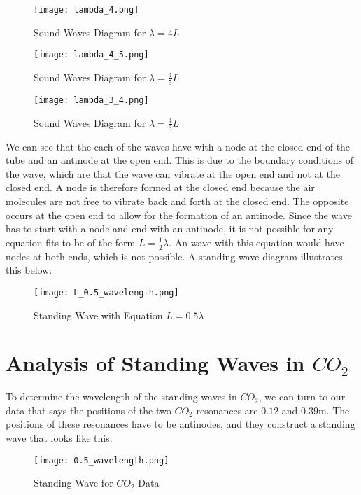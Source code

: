 \documentclass[11pt,twoside]{article}
\begin{document}

\begin{figure}[H]
    \centering
    \texttt{[image: lambda\_4.png]}
    \caption{Sound Waves Diagram for $\lambda = 4L$}
    
    \texttt{[image: lambda\_4\_5.png]}
    \caption{Sound Waves Diagram for $\lambda = \frac{4}{5}L$}
    
    \texttt{[image: lambda\_3\_4.png]}
    \caption{Sound Waves Diagram for $\lambda = \frac{4}{3}L$}
\end{figure}

We can see that the each of the waves have with a node at the closed end of the tube and an antinode at the open end. This is due to the boundary conditions of the wave, which are that the wave can vibrate at the open end and not at the closed end. A node is therefore formed at the closed end because the air molecules are not free to vibrate back and forth at the closed end. The opposite occurs at the open end to allow for the formation of an antinode. Since the wave has to start with a node and end with an antinode, it is not possible for any equation fits to be of the form $L = \frac{1}{2}\lambda$. An wave with this equation would have nodes at both ends, which is not possible. A standing wave diagram illustrates this below:

\begin{figure}[H]
    \centering
    \texttt{[image: L\_0.5\_wavelength.png]}
    \caption{Standing Wave with Equation $L = 0.5\lambda$}
\end{figure}

\section{Analysis of Standing Waves in $CO_2$}

To determine the wavelength of the standing waves in $CO_2$, we can turn to our data that says the positions of the two $CO_2$ resonances are $0.12$ and $0.39$m. The positions of these resonances have to be antinodes, and they construct a standing wave that looks like this:

\begin{figure}[H]
    \centering
    \texttt{[image: 0.5\_wavelength.png]}
    \caption{Standing Wave for $CO_2$ Data}
\end{figure}
\end{document}
